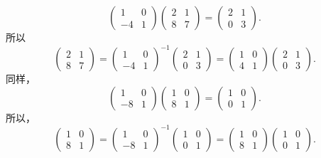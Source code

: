 ﻿\documentclass{book} \usepackage{exsheets} \usepackage{xeCJK}
\begin{document}
\begin{solution}
$$
\begin{pmatrix}
  1&0\\
  -4&1
\end{pmatrix}
\begin{pmatrix}
  2&1\\
  8&7
\end{pmatrix}=
\begin{pmatrix}
  2&1\\
  0&3
\end{pmatrix}.
$$
所以
$$
\begin{pmatrix}
  2&1\\
  8&7
\end{pmatrix}=
\begin{pmatrix}
  1&0\\
  -4&1
\end{pmatrix}^{-1}
\begin{pmatrix}
  2&1\\
  0&3
\end{pmatrix}=
\begin{pmatrix}
  1&0\\
  4&1
\end{pmatrix}
\begin{pmatrix}
  2&1\\
  0&3
\end{pmatrix}.
$$
同样，
$$
\begin{pmatrix}
  1&0\\
  -8&1
\end{pmatrix}
\begin{pmatrix}
  1&0\\
  8&1
\end{pmatrix}=
\begin{pmatrix}
  1&0\\
  0&1
\end{pmatrix}.
$$
所以，
$$
\begin{pmatrix}
  1&0\\
  8&1
\end{pmatrix}=
\begin{pmatrix}
  1&0\\
  -8&1
\end{pmatrix}^{-1}
\begin{pmatrix}
  1&0\\
  0&1
\end{pmatrix}=
\begin{pmatrix}
  1&0\\
  8&1
\end{pmatrix}
\begin{pmatrix}
  1&0\\
  0&1
\end{pmatrix}.
$$
\end{solution}
\end{document}
